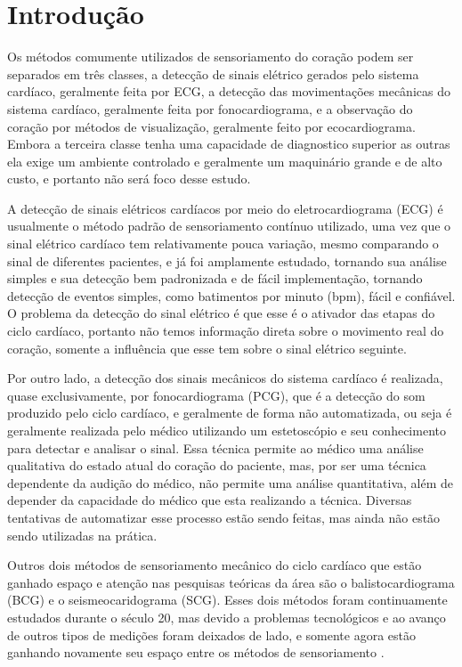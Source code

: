 \chapter{Introdução}

    Os métodos comumente utilizados de sensoriamento do coração podem ser separados em três classes, a detecção de sinais elétrico gerados pelo sistema cardíaco, geralmente feita por ECG, a detecção das movimentações mecânicas do sistema cardíaco, geralmente feita por fonocardiograma, e a observação do coração por métodos de visualização, geralmente feito por ecocardiograma. Embora a terceira classe tenha uma capacidade de diagnostico superior as outras ela exige um ambiente controlado e geralmente um maquinário grande e de alto custo, e portanto não será foco desse estudo.

    A detecção de sinais elétricos cardíacos por meio do eletrocardiograma (ECG)  é usualmente o método padrão de sensoriamento contínuo utilizado, uma vez que o sinal elétrico cardíaco tem relativamente pouca variação, mesmo comparando o sinal de diferentes pacientes, e já foi amplamente estudado, tornando sua análise simples e sua detecção bem padronizada e de fácil implementação, tornando detecção de eventos simples, como batimentos por minuto (bpm), fácil e confiável. O problema da detecção do sinal elétrico é que esse é o ativador das etapas do ciclo cardíaco, portanto não temos informação direta sobre o movimento real do coração, somente a influência que esse tem sobre o sinal elétrico seguinte.

    Por outro lado, a detecção dos sinais mecânicos do sistema cardíaco é realizada, quase exclusivamente, por fonocardiograma (PCG), que é a detecção do som produzido pelo ciclo cardíaco, e geralmente de forma não automatizada, ou seja é geralmente realizada pelo médico utilizando um estetoscópio e seu conhecimento para detectar e analisar o sinal. Essa técnica permite ao médico uma análise qualitativa do estado atual do coração do paciente, mas, por ser uma técnica dependente da audição do médico, não permite uma análise quantitativa, além de depender da capacidade do médico que esta realizando a técnica.%
Diversas tentativas de automatizar esse processo estão sendo feitas, mas ainda não estão sendo utilizadas na prática. %

    Outros dois métodos de sensoriamento mecânico do ciclo cardíaco que estão ganhado espaço e atenção nas pesquisas teóricas da área são o balistocardiograma (BCG) e o seismeocaridograma (SCG). Esses dois métodos foram continuamente estudados durante o século 20, mas devido a problemas tecnológicos e ao avanço de outros tipos de medições foram deixados de lado, e somente agora estão ganhando novamente seu espaço entre os métodos de sensoriamento \cite{ballistoAndSeisReview}.
    
